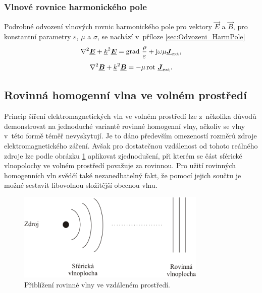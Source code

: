 \subsubsection*{Vlnové rovnice harmonického pole}
 Podrobné odvození vlnových rovnic harmonického pole pro vektory $\vec E$ a $\vec B$, pro konstantní parametry $\varepsilon$, $\mu$ a $\sigma$, se nachází v~příloze \ref{sec:Odvozeni_HarmPole}
\begin{equation}
	\nabla^{2}\mbox{\underline{\boldmath$E$}} +{\underline{k}}^{2}\mbox{\underline{\boldmath$E$}} = \mathrm{grad}\ \frac{\rho}{\varepsilon}+ \mathrm{j}\omega\mu\mbox{\underline{\boldmath$J$}}_{\mathrm{ext}},
	\label{rce:evlny_VlnR_ElPole_harm} 
\end{equation}
\begin{equation}
	\nabla^{2}\mbox{\underline{\boldmath$B$}} +{\underline{k}}^{2}\mbox{\underline{\boldmath$B$}} = -\mu\,\mathrm{rot}\ \mbox{\underline{\boldmath$J$}}_{\mathrm{ext}}.
	\label{rce:evlny_VlnR_MagPole_harm} 
\end{equation}

\subsection{Rovinná homogenní vlna ve volném prostředí}
Princip šíření elektromagnetických vln ve volném prostředí lze z~několika důvodů demonstrovat na jednoduché variantě rovinné homogenní vlny, ačkoliv se vlny v~této formě téměř nevyskytují. Je to dáno především omezeností rozměrů zdroje elektromagnetického záření. Avšak pro dostatečnou vzdálenost od tohoto reálného zdroje lze podle obrázku \ref{obr:evlny_rovinna_vlna} aplikovat zjednodušení, při kterém se část sférické vlnopolochy ve volném prostředí považuje za rovinnou. Pro užití rovinných homogenních vln svědčí také nezanedbatelný fakt, že pomocí jejich součtu je možné sestavit libovolnou složitější obecnou vlnu. 

\begin{figure}[!h]
	\centering
	\includegraphics[width=9cm]{evlny_rovinna_vlna.png}
	\caption{Přiblížení rovinné vlny ve vzdáleném prostředí.}
	\label{obr:evlny_rovinna_vlna}
\end{figure}

